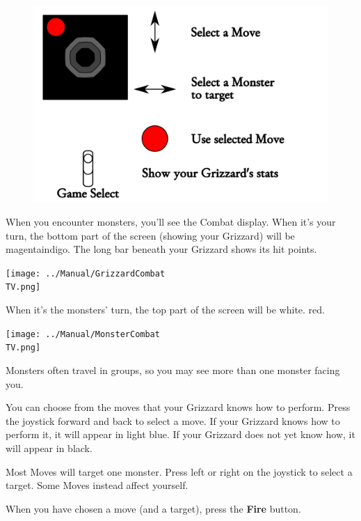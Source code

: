 \documentclass[10pt,twocolumn,openany,article]{memoir}
\newcommand\TV{NTSC}
\newcommand\TV{PAL}
\newcommand\TV{SECAM}
\begin{document}
\begin{figure}[ht]
  \includegraphics[width=2\columnwidth]{../Manual/CombatControls.png}
\end{figure}

When you  encounter monsters, you'll  see the Combat display.  When it's
your turn, the bottom part of the screen (showing your Grizzard) will be
\ifdefined\TVSECAM magenta\else  indigo\fi{}. The long bar  beneath your
Grizzard shows its hit points.

\begin{center}
  \texttt{[image: ../Manual/GrizzardCombat\\TV.png]}
\end{center}

When  it's the  monsters'  turn, the  top  part of  the  screen will  be
\ifdefined\TVSECAM white. \else red. \fi

\begin{center}
  \texttt{[image: ../Manual/MonsterCombat\\TV.png]}
\end{center}

Monsters often  travel in groups, so  you may see more  than one monster
facing you.

You can choose  from the moves that your Grizzard  knows how to perform.
Press the joystick  forward and back to select a  move. If your Grizzard
knows how to perform it, it will  appear in light blue. If your Grizzard
does not yet know how, it will appear in black.

Most Moves will target one monster.  Press left or right on the joystick
to select a target. Some Moves instead affect yourself.

When   you   have   chosen   a   move  (and   a   target),   press   the
\textbf{Fire} button.
\end{document}
